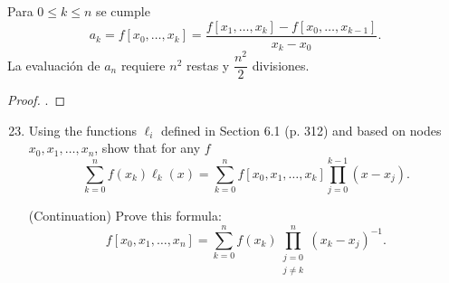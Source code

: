 \begin{frame}
	\begin{theorem}
		Para $0\leq k\leq n$ se cumple
		\begin{equation*}
			a_{k}=
			f\left[x_{0},\ldots,x_{k}\right]=
			\dfrac{
			f\left[x_{1},\ldots,x_{k}\right]-
			f\left[x_{0},\ldots,x_{k-1}\right]
			}{x_{k}-x_{0}}.
		\end{equation*}
		La evaluación de $a_{n}$ requiere $n^{2}$ restas y
		$\dfrac{n^{2}}{2}$ divisiones.
	\end{theorem}

	\begin{proof}
		.
	\end{proof}

\end{frame}

\begin{frame}
	\begin{enumerate}\setcounter{enumi}{22}
		\item

		      Using the functions $\ell_{i}$ defined in Section 6.1
		      (p. 312) and based on nodes $x_{0}, x_{1}, \ldots, x_{n}$,
		      show that for any $f$
		      \begin{equation*}
			      \sum\limits_{k=0}^{n}
			      f\left(x_{k}\right)
			      \ell_{k}\left(x\right)=
			      \sum\limits_{k=0}^{n}
			      f\left[x_{0},x_{1},\ldots,x_{k}\right]
			      \prod\limits_{j=0}^{k-1}
			      \left(x-x_{j}\right).
		      \end{equation*}

		      (Continuation) Prove this formula:
		      \begin{equation*}
			      f\left[x_{0},x_{1},\ldots,x_{n}\right]=
			      \sum\limits_{k=0}^{n}
			      f\left(x_{k}\right)
			      \prod\limits_{\substack{j=0\\j\neq k}}^{n}
			      {\left(x_{k}-x_{j}\right)}^{-1}.
		      \end{equation*}
	\end{enumerate}
\end{frame}

